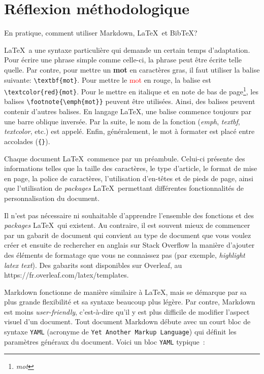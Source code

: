 \documentclass[
  letterpaper,
]{scrbook}
\begin{document}
\hypertarget{ruxe9flexion-muxe9thodologique-1}{%
\section{Réflexion
méthodologique}\label{ruxe9flexion-muxe9thodologique-1}}

En pratique, comment utiliser Markdown, \LaTeX~et BibTeX?

\LaTeX~a une syntaxe particulière qui demande un certain temps
d'adaptation. Pour écrire une phrase simple comme celle-ci, la phrase
peut être écrite telle quelle. Par contre, pour mettre un \textbf{mot}
en caractères gras, il faut utiliser la balise suivante:
\texttt{\textbackslash{}textbf\{mot\}}. Pour mettre le
\textcolor{red}{mot} en rouge, la balise est
\texttt{\textbackslash{}textcolor\{red\}\{mot\}}. Pour le mettre en
italique et en note de bas de page\footnote{\emph{mot}}, les balises
\texttt{\textbackslash{}footnote\{\textbackslash{}emph\{mot\}\}} peuvent
être utilisées. Ainsi, des balises peuvent contenir d'autres balises. En
langage \LaTeX, une balise commence toujours par une barre oblique
inversée. Par la suite, le nom de la fonction (\emph{emph},
\emph{textbf}, \emph{textcolor}, etc.) est appelé. Enfin, généralement,
le mot à formater est placé entre accolades (\texttt{\{\}}).

Chaque document \LaTeX~commence par un préambule. Celui-ci présente des
informations telles que la taille des caractères, le type d'article, le
format de mise en page, la police de caractères, l'utilisation
d'en-têtes et de pieds de page, ainsi que l'utilisation de
\emph{packages} \LaTeX~permettant différentes fonctionnalités de
personnalisation du document.

Il n'est pas nécessaire ni souhaitable d'apprendre l'ensemble des
fonctions et des \emph{packages} \LaTeX~qui existent. Au contraire, il
est souvent mieux de commencer par un gabarit de document qui convient
au type de document que vous voulez créer et ensuite de rechercher en
anglais sur Stack Overflow la manière d'ajouter des éléments de
formatage que vous ne connaissez pas (par exemple, \emph{highlight latex
text}). Des gabarits sont disponibles sur Overleaf, au
https://fr.overleaf.com/latex/templates.

Markdown fonctionne de manière similaire à \LaTeX, mais se démarque par
sa plus grande flexibilité et sa syntaxe beaucoup plus légère. Par
contre, Markdown est moins \emph{user-friendly}, c'est-à-dire qu'il y
est plus difficile de modifier l'aspect visuel d'un document. Tout
document Markdown débute avec un court bloc de syntaxe \texttt{YAML}
(acronyme de \texttt{Yet\ Another\ Markup\ Language}) qui définit les
paramètres généraux du document. Voici un bloc \texttt{YAML} typique~:
\end{document}
